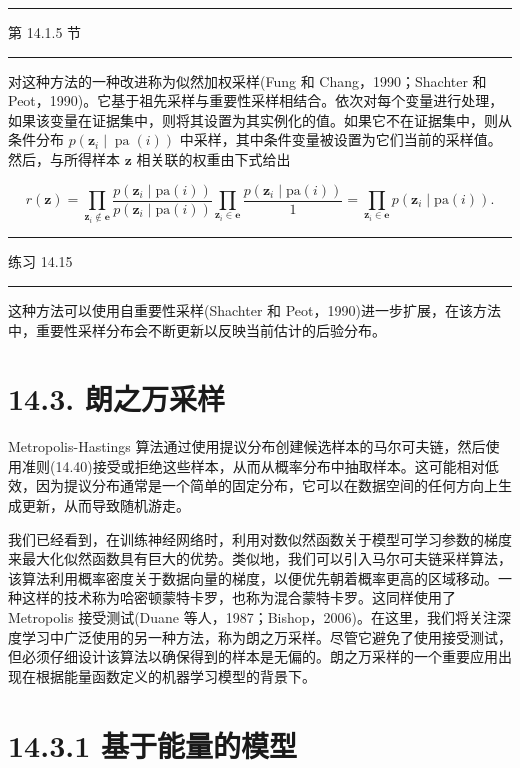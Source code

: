 \documentclass[10pt]{article}
\newcommand{\HRule}{\begin{center}\rule{0.9\linewidth}{0.2mm}\end{center}}
\begin{document}
\HRule

第 14.1.5 节

\HRule

对这种方法的一种改进称为似然加权采样(Fung 和 Chang，1990；Shachter 和 Peot，1990)。它基于祖先采样与重要性采样相结合。依次对每个变量进行处理，如果该变量在证据集中，则将其设置为其实例化的值。如果它不在证据集中，则从条件分布 \(p\left( {{\mathbf{z}}_{i} \mid  \operatorname{pa}\left( i\right) }\right)\) 中采样，其中条件变量被设置为它们当前的采样值。然后，与所得样本 \(\mathbf{z}\) 相关联的权重由下式给出

\[
r\left( \mathbf{z}\right)  = \mathop{\prod }\limits_{{{\mathbf{z}}_{i} \notin  \mathbf{e}}}\frac{p\left( {{\mathbf{z}}_{i} \mid  \mathrm{{pa}}\left( i\right) }\right) }{p\left( {{\mathbf{z}}_{i} \mid  \mathrm{{pa}}\left( i\right) }\right) }\mathop{\prod }\limits_{{{\mathbf{z}}_{i} \in  \mathbf{e}}}\frac{p\left( {{\mathbf{z}}_{i} \mid  \mathrm{{pa}}\left( i\right) }\right) }{1} = \mathop{\prod }\limits_{{{\mathbf{z}}_{i} \in  \mathbf{e}}}p\left( {{\mathbf{z}}_{i} \mid  \mathrm{{pa}}\left( i\right) }\right) . \tag{14.48}
\]

\HRule

练习 14.15

\HRule

这种方法可以使用自重要性采样(Shachter 和 Peot，1990)进一步扩展，在该方法中，重要性采样分布会不断更新以反映当前估计的后验分布。

\section*{14.3. 朗之万采样}

Metropolis-Hastings 算法通过使用提议分布创建候选样本的马尔可夫链，然后使用准则(14.40)接受或拒绝这些样本，从而从概率分布中抽取样本。这可能相对低效，因为提议分布通常是一个简单的固定分布，它可以在数据空间的任何方向上生成更新，从而导致随机游走。

我们已经看到，在训练神经网络时，利用对数似然函数关于模型可学习参数的梯度来最大化似然函数具有巨大的优势。类似地，我们可以引入马尔可夫链采样算法，该算法利用概率密度关于数据向量的梯度，以便优先朝着概率更高的区域移动。一种这样的技术称为哈密顿蒙特卡罗，也称为混合蒙特卡罗。这同样使用了 Metropolis 接受测试(Duane 等人，1987；Bishop，2006)。在这里，我们将关注深度学习中广泛使用的另一种方法，称为朗之万采样。尽管它避免了使用接受测试，但必须仔细设计该算法以确保得到的样本是无偏的。朗之万采样的一个重要应用出现在根据能量函数定义的机器学习模型的背景下。

\section*{14.3.1 基于能量的模型}
\end{document}
